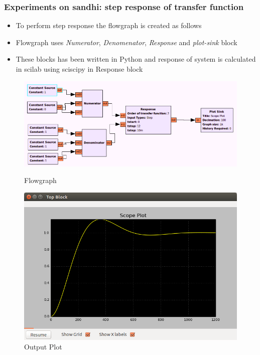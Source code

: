 \documentclass{beamer}
\begin{document}
\begin{frame}
        \frametitle{Experiments on sandhi: step response of transfer function}
        \begin{itemize}
	\item To perform step response the flowgraph is created as follows
	\item Flowgraph uses \textit{Numerator}, \textit{Denomenator}, \textit{Response} and \textit{plot-sink} block
	\item These blocks has been written in Python and response of system is calculated in scilab using sciscipy in Response block
        \end{itemize}
\begin{figure}
        \centering
        \begin{minipage}{.5\textwidth}
            \centering
            \includegraphics[width=.9\linewidth]{step_resp.png}
            \caption{Flowgraph}
        \end{minipage}%
        \begin{minipage}{.5\textwidth}
            \centering
            \includegraphics[width=.6\linewidth]{step_out.png}
            \caption{Output Plot}
        \end{minipage}
    \end{figure}
\end{frame}
\end{document}
